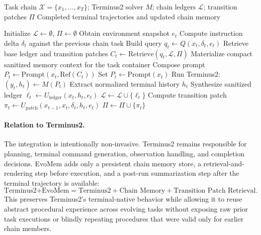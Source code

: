 \documentclass{llmxive}
\begin{document}
\begin{algorithm}[H]
\caption{EvoMem: Chain-Scoped Patch Memory for Terminus2}
\label{alg:evomem_terminus2}
\begin{algorithmic}[1]
\Require Task chain $\mathcal{X}=\{x_1,\ldots,x_T\}$; Terminus2 solver $M$; chain ledgers $\mathcal{L}$; transition patches $\Pi$
\Ensure Completed terminal trajectories and updated chain memory

\State Initialize $\mathcal{L}\gets\emptyset$, $\Pi\gets\emptyset$
    \State Obtain environment snapshot $e_t$
        \State Compute instruction delta $\delta_t$ against the previous chain task
        \State Build query $q_t\leftarrow Q(x_t,\delta_t,e_t)$
        \State Retrieve base ledger and transition patches $C_t\leftarrow \mathrm{Retrieve}(q_t,\mathcal{L},\Pi)$
        \State Materialize compact sanitized memory context for the task container
        \State Compose prompt $P_t\leftarrow \mathrm{Prompt}(x_t,\mathrm{Ref}(C_t))$
    \Else
        \State Set $P_t\leftarrow \mathrm{Prompt}(x_t)$
    \EndIf
    \State Run Terminus2: $(y_t,h_t)\leftarrow M(P_t)$
    \State Extract normalized terminal history $h_t$
    \State Synthesize sanitized ledger $\ell_t\leftarrow U_{\mathrm{ledger}}(x_t,h_t,e_t)$
    \State $\mathcal{L}\leftarrow\mathcal{L}\cup\{\ell_t\}$
        \State Compute transition patch $\pi_t\leftarrow U_{\mathrm{patch}}(x_{t-1},x_t,\delta_t,h_t,e_t)$
        \State $\Pi\leftarrow\Pi\cup\{\pi_t\}$
    \EndIf
\EndFor
\end{algorithmic}
\end{algorithm}

\paragraph{Relation to Terminus2.}
The integration is intentionally non-invasive. Terminus2 remains responsible for planning, terminal command generation, observation handling, and completion decisions. EvoMem adds only a persistent chain memory store, a retrieval-and-rendering step before execution, and a post-run summarization step after the terminal trajectory is available:
\[
\text{Terminus2+EvoMem}
=
\text{Terminus2}
+
\text{Chain Memory}
+
\text{Transition Patch Retrieval}.
\]
This preserves Terminus2's terminal-native behavior while allowing it to reuse abstract procedural experience across evolving tasks without exposing raw prior task executions or blindly repeating procedures that were valid only for earlier chain members.
\end{document}
